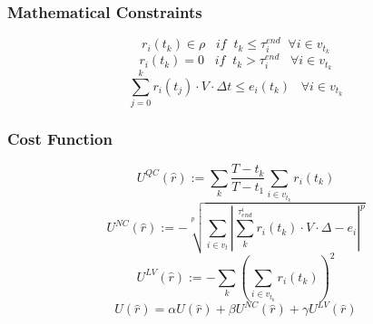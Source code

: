 \documentclass{beamer}
\begin{document}
    \begin{frame}
    \frametitle{Mathematical Constraints}
    
        $$r_i(t_k)\in \rho \;\;\;if\;\;t_k\leq \tau_i^{end}\;\;\forall i \in v_{t_k}$$
        \pause
        $$r_i(t_k) = 0\;\;\; if\;\; t_k>\tau_i^{end}\;\;\;\forall i \in v_{t_k}$$
        \pause
        $$\sum_{j=0}^k r_i(t_j)\cdot V \cdot \Delta t \leq e_i(t_k)\;\;\;\forall i \in v_{t_k}$$
    
    \end{frame}


\begin{frame}
\frametitle{Cost Function}
$$U^{QC}(\hat{r}):= \sum_{k}\frac{T - t_k}{T-t_1}\sum_{i \in v_{t_k}} r_i(t_k)$$
$$U^{NC}(\hat{r}):=- \sqrt[p]{\sum_{i\in v_t}|\sum_{k}^{\tau^i_{end}} r_i(t_k)\cdot V\cdot \Delta - e_i|^p}$$
$$U^{LV}(\hat{r}):=-\sum_{k}\left(\sum_{i \in v_{t_k}} r_i(t_k)\right)^2$$
\pause
$$U(\hat{r}) = \alpha U(\hat{r}) + \beta U^{NC}(\hat{r})+ \gamma U^{LV}(\hat{r})$$
\end{frame}
\end{document}
